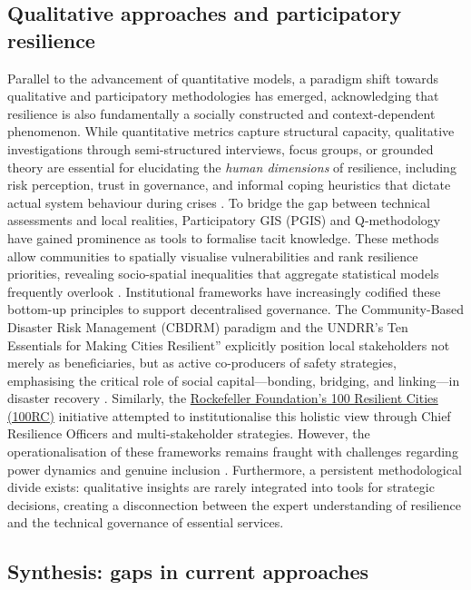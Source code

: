 \documentclass[review,12pt]{elsarticle}
\begin{document}
\subsection{Qualitative approaches and participatory resilience} \label{subsec:qualitative} Parallel to the advancement of quantitative models, a paradigm shift towards qualitative and participatory methodologies has emerged, acknowledging that resilience is also fundamentally a socially constructed and context-dependent phenomenon. While quantitative metrics capture structural capacity, qualitative investigations through semi-structured interviews, focus groups, or grounded theory are essential for elucidating the \textit{human dimensions} of resilience, including risk perception, trust in governance, and informal coping heuristics that dictate actual system behaviour during crises \cite{Aldunce2015_Resilience, BraunClarke2006}. To bridge the gap between technical assessments and local realities, Participatory GIS (PGIS) \cite{McCall2003} and Q-methodology\cite{lundberg2020} have gained prominence as tools to formalise tacit knowledge. These methods allow communities to spatially visualise vulnerabilities and rank resilience priorities, revealing socio-spatial inequalities that aggregate statistical models frequently overlook \cite{Cadag2012_PGIS, Ma2024}. Institutional frameworks have increasingly codified these bottom-up principles to support decentralised governance. The Community-Based Disaster Risk Management (CBDRM) paradigm and the UNDRR's Ten Essentials for Making Cities Resilient'' explicitly position local stakeholders not merely as beneficiaries, but as active co-producers of safety strategies, emphasising the critical role of social capital—bonding, bridging, and linking—in disaster recovery \cite{UNDRR2023Handbook, Shaw2012}. Similarly, the \href{https://www.rockefellerfoundation.org/}{Rockefeller Foundation's 100 Resilient Cities (100RC)} initiative attempted to institutionalise this holistic view through Chief Resilience Officers and multi-stakeholder strategies. However, the operationalisation of these frameworks remains fraught with challenges regarding power dynamics and genuine inclusion \cite{Spaans2017,Hofmann2021}. Furthermore, a persistent methodological divide exists: qualitative insights are rarely integrated into tools for strategic decisions, creating a disconnection between the expert understanding of resilience and the technical governance of essential services.


\subsection{Synthesis: gaps in current approaches}
\label{subsec:gaps}
\end{document}
